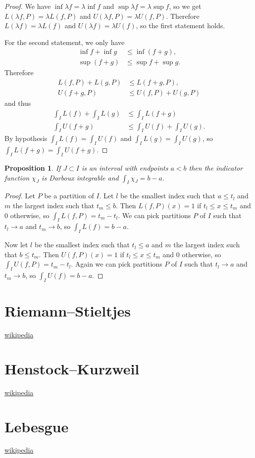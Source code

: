 \documentclass[11pt]{amsart}
\newtheorem{prop}[theo]{Proposition}
\theoremstyle{definition}
\begin{document}
\begin{proof}
We have $\inf \lambda f = \lambda \inf f$ and $\sup \lambda f = \lambda \sup f$, so we get $L(\lambda f, P) = \lambda L(f, P)$ and $U(\lambda f, P) = \lambda U(f, P)$.
Therefore $L(\lambda f) = \lambda L(f)$ and $U(\lambda f) = \lambda U(f)$, so the first statement holds.

For the second statement, we only have
\begin{align*}
\inf f + \inf g
&\leq \inf(f + g),
\\
\sup(f + g)
&\leq \sup f + \sup g.
\end{align*}
Therefore
\begin{align*}
L(f, P) + L(g, P) 
&\leq L(f + g, P),
\\
U(f + g, P) 
&\leq U(f, P) + U(g, P)
\end{align*}
and thus
\begin{align*}
\int_I L(f) + \int_I L(g) &\leq \int_I L(f + g)
\\
\int_I U(f + g) &\leq \int_I U(f) + \int_I U(g).
\end{align*}
By hypothesis $\int_I L(f) = \int_I U(f)$ and $\int_I L(g) = \int_I U(g)$, so $\int_I L(f+g) = \int_I U(f+g)$.
\end{proof}


\begin{prop}
If $J \subset I$ is an interval with endpoints $a < b$ then the indicator function $\chi_J$ is Darboux integrable and $\int_I \chi_J = b - a$.
\end{prop}

\begin{proof}
Let $P$ be a partition of $I$.
Let $l$ be the smallest index such that $a \leq t_l$ and $m$ the largest index such that $t_m \leq b$.
Then $L(f, P)(x) = 1$ if $t_l \leq x \leq t_m$ and $0$ otherwise, so $\int_I L(f,P) = t_m - t_l$.
We can pick partitions $P$ of $I$ such that $t_l \to a$ and $t_m \to b$, so $\int_I L(f) = b - a$.

Now let $l$ be the smallest index such that $t_l \leq a$ and $m$ the largest index such that $b \leq t_m$.
Then $U(f, P)(x) = 1$ if $t_l \leq x \leq t_m$ and $0$ otherwise, so $\int_I U(f, P) = t_m - t_l$.
Again we can pick partitions $P$ of $I$ such that $t_l \to a$ and $t_m \to b$, so $\int_I U(f) = b - a$.
\end{proof}







\section{Riemann--Stieltjes}

\href{https://en.wikipedia.org/wiki/Riemann%E2%80%93Stieltjes_integral}{wikipedia}



\section{Henstock--Kurzweil}

\href{https://en.wikipedia.org/wiki/Henstock%E2%80%93Kurzweil_integral}{wikipedia}


\section{Lebesgue}

\href{https://en.wikipedia.org/wiki/Lebesgue_integral}{wikipedia}
\end{document}
